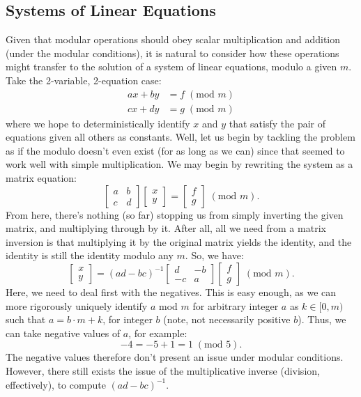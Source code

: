 \documentclass{article}
\begin{document}
\subsection{Systems of Linear Equations}
Given that modular operations should obey scalar multiplication and addition (under the modular conditions), it is natural to consider how these operations might transfer to the solution of a system of linear equations, modulo a given $m$. Take the 2-variable, 2-equation case:
\begin{align*}
    ax + by &= f \; (\text{mod } m) \\
    cx + dy &= g \; (\text{mod } m)
\end{align*}
where we hope to deterministically identify $x$ and $y$ that satisfy the pair of equations given all others as constants. Well, let us begin by tackling the problem as if the modulo doesn't even exist (for as long as we can) since that seemed to work well with simple multiplication. We may begin by rewriting the system as a matrix equation:
\[
    \begin{bmatrix}
        a & b \\
        c & d
    \end{bmatrix} \begin{bmatrix}
        x \\
        y
    \end{bmatrix} = \begin{bmatrix}
        f \\
        g
    \end{bmatrix} \; (\text{mod } m).
\]
From here, there's nothing (so far) stopping us from simply inverting the given matrix, and multiplying through by it. After all, all we need from a matrix inversion is that multiplying it by the original matrix yields the identity, and the identity is still the identity modulo any $m$. So, we have:
\[
    \begin{bmatrix}
        x \\
        y
    \end{bmatrix} = (ad - bc)^{-1} \begin{bmatrix}
        d & -b \\
        -c & a
    \end{bmatrix} \begin{bmatrix}
        f \\
        g
    \end{bmatrix} \; (\text{mod } m).
\]
Here, we need to deal first with the negatives. This is easy enough, as we can more rigorously uniquely identify $a$ mod $m$ for arbitrary integer $a$ as $k \in [0, m)$ such that $a = b \cdot m + k$, for integer $b$ (note, not necessarily positive $b$). Thus, we can take negative values of $a$, for example:
\[
    -4 = -5 + 1 = 1 \; (\text{mod } 5).
\]
The negative values therefore don't present an issue under modular conditions. However, there still exists the issue of the multiplicative inverse (division, effectively), to compute $(ad - bc)^{-1}$.
\end{document}

